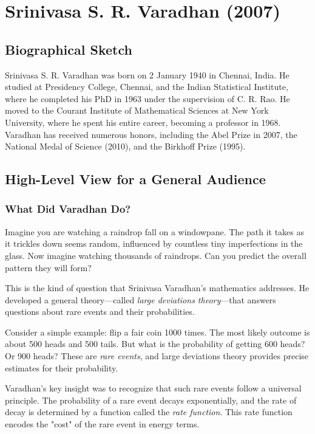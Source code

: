 \chapter{Srinivasa S. R. Varadhan (2007)}

\section{Biographical Sketch}



Srinivasa S. R. Varadhan was born on 2 January 1940 in Chennai, India. He studied at Presidency College, Chennai, and the Indian Statistical Institute, where he completed his PhD in 1963 under the supervision of C. R. Rao. He moved to the Courant Institute of Mathematical Sciences at New York University, where he spent his entire career, becoming a professor in 1968. Varadhan has received numerous honors, including the Abel Prize in 2007, the National Medal of Science (2010), and the Birkhoff Prize (1995).

\section{High-Level View for a General Audience}

\subsection{What Did Varadhan Do?}

Imagine you are watching a raindrop fall on a windowpane. The path it takes as it trickles down seems random, influenced by countless tiny imperfections in the glass. Now imagine watching thousands of raindrops. Can you predict the overall pattern they will form?

This is the kind of question that Srinivasa Varadhan's mathematics addresses. He developed a general theory---called \emph{large deviations theory}---that answers questions about rare events and their probabilities.

Consider a simple example: flip a fair coin 1000 times. The most likely outcome is about 500 heads and 500 tails. But what is the probability of getting 600 heads? Or 900 heads? These are \emph{rare events}, and large deviations theory provides precise estimates for their probability.

Varadhan's key insight was to recognize that such rare events follow a universal principle. The probability of a rare event decays exponentially, and the rate of decay is determined by a function called the \emph{rate function}. This rate function encodes the "cost" of the rare event in energy terms.


